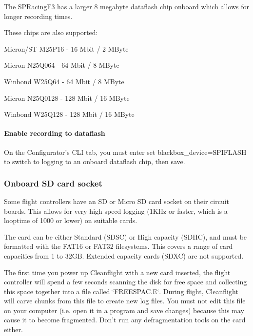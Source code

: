 The S\+P\+Racing\+F3 has a larger 8 megabyte dataflash chip onboard which allows for longer recording times.

These chips are also supported\+:


\begin{DoxyItemize}
\item Micron/\+S\+T M25\+P16 -\/ 16 Mbit / 2 M\+Byte
\item Micron N25\+Q064 -\/ 64 Mbit / 8 M\+Byte
\item Winbond W25\+Q64 -\/ 64 Mbit / 8 M\+Byte
\item Micron N25\+Q0128 -\/ 128 Mbit / 16 M\+Byte
\item Winbond W25\+Q128 -\/ 128 Mbit / 16 M\+Byte
\end{DoxyItemize}

\paragraph*{Enable recording to dataflash}

On the Configurator's C\+L\+I tab, you must enter {\ttfamily set blackbox\+\_\+device=S\+P\+I\+F\+L\+A\+S\+H} to switch to logging to an onboard dataflash chip, then save.

\subsubsection*{Onboard S\+D card socket}

Some flight controllers have an S\+D or Micro S\+D card socket on their circuit boards. This allows for very high speed logging (1\+K\+Hz or faster, which is a looptime of 1000 or lower) on suitable cards.

The card can be either Standard (S\+D\+S\+C) or High capacity (S\+D\+H\+C), and must be formatted with the F\+A\+T16 or F\+A\+T32 filesystems. This covers a range of card capacities from 1 to 32\+G\+B. Extended capacity cards (S\+D\+X\+C) are not supported.

The first time you power up Cleanflight with a new card inserted, the flight controller will spend a few seconds scanning the disk for free space and collecting this space together into a file called \char`\"{}\+F\+R\+E\+E\+S\+P\+A\+C.\+E\char`\"{}. During flight, Cleanflight will carve chunks from this file to create new log files. You must not edit this file on your computer (i.\+e. open it in a program and save changes) because this may cause it to become fragmented. Don't run any defragmentation tools on the card either.

